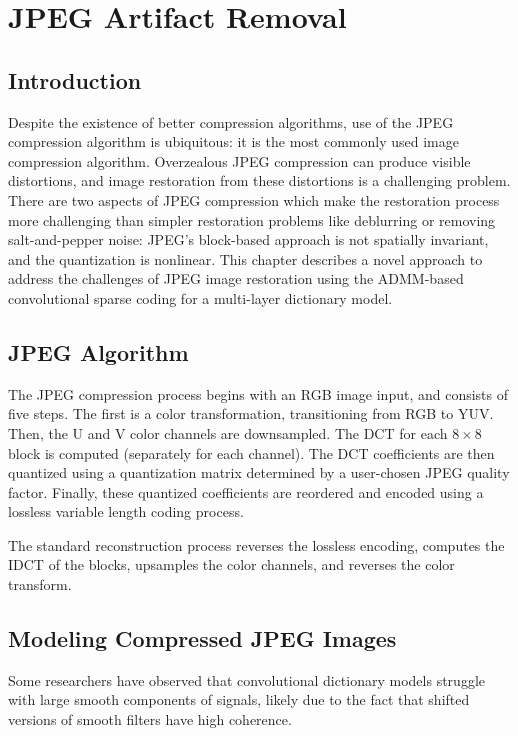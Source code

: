 \chapter{JPEG Artifact Removal}
\section{Introduction}
Despite the existence of better compression algorithms, use of the JPEG compression algorithm is ubiquitous: it is the most commonly used image compression algorithm.  Overzealous JPEG compression can produce visible distortions, and image restoration from these distortions is a challenging problem. There are two aspects of JPEG compression which make the restoration process more challenging than simpler restoration problems like deblurring or removing salt-and-pepper noise: JPEG's block-based approach is not spatially invariant, and the quantization is nonlinear. This chapter describes a novel approach to address the challenges of JPEG image restoration using the ADMM-based convolutional sparse coding for a multi-layer dictionary model.
\section{JPEG Algorithm}

The JPEG compression process begins with an RGB image input, and consists of five steps. The first is a color transformation, transitioning from RGB to YUV. Then, the U and V color channels are downsampled.  The DCT for each $8 \times 8$ block is computed (separately for each channel).  The DCT coefficients are then quantized using a quantization matrix determined by a user-chosen JPEG quality factor. Finally, these quantized coefficients are reordered and encoded using a lossless variable length coding process.

The standard reconstruction process reverses the lossless encoding, computes the IDCT of the blocks, upsamples the color channels, and reverses the color transform.
\section{Modeling Compressed JPEG Images}
Some researchers have observed that convolutional dictionary models struggle with large smooth components of signals, likely due to the fact that shifted versions of smooth filters have high coherence.

